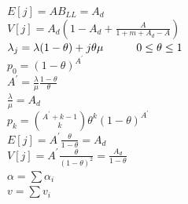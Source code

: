 \begin{minipage}{.22\textwidth}
	$E[j]=AB_{LL}=A_d$ \\
	$V[j]=A_d(1-A_d+\frac{A}{1+m+A_d-A})$ \\
	$\lambda_j=\lambda(1-\theta)+j\theta\mu \hskip 3em 0\le{\theta}\le{1}$ \\
	$p_0=(1-\theta)^{A^{'}}$ \\
	$A^{'}=\frac{\lambda}{\mu}\frac{1-\theta}{\theta}$ \\
	$\frac{\lambda}{\mu}=A_d$ \\
	$p_k=\binom{A^{'}+k-1}{k}\theta^k(1-\theta)^{A^{'}}$\\
	$E[j]=A^{'}\frac{\theta}{1-\theta}=A_d$ \\
	$V[j]=A^{'}\frac{\theta}{(1-\theta)^2}=\frac{A_d}{1-\theta}$ \\
	$\alpha=\sum{\alpha_i}$ \\
	$v=\sum{v_i}$ \\
\end{minipage}

